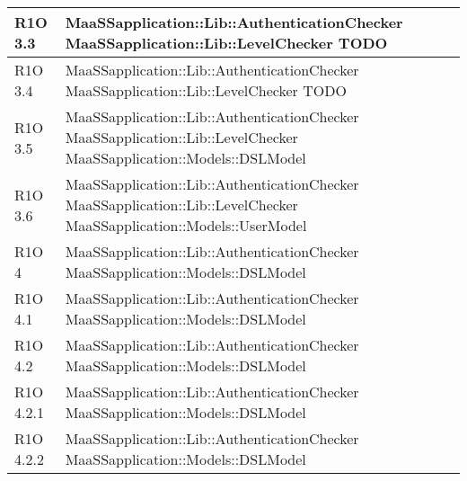 \begin{center}
\begin{longtable}{ | l | p{8cm} |}
	R1O 3.3 & MaaSSapplication::Lib::AuthenticationChecker \newline MaaSSapplication::Lib::LevelChecker TODO  \newline  \\ \hline
	
	R1O 3.4 & MaaSSapplication::Lib::AuthenticationChecker \newline MaaSSapplication::Lib::LevelChecker TODO  \newline  \\ \hline
	
	R1O 3.5 & MaaSSapplication::Lib::AuthenticationChecker \newline MaaSSapplication::Lib::LevelChecker \newline MaaSSapplication::Models::DSLModel  \newline  \\ \hline
	
	R1O 3.6 & MaaSSapplication::Lib::AuthenticationChecker \newline MaaSSapplication::Lib::LevelChecker \newline MaaSSapplication::Models::UserModel  \newline  \\ \hline
	
	R1O 4 & MaaSSapplication::Lib::AuthenticationChecker \newline MaaSSapplication::Models::DSLModel  \newline  \\ \hline
	
	R1O 4.1 & MaaSSapplication::Lib::AuthenticationChecker \newline MaaSSapplication::Models::DSLModel  \newline  \\ \hline
	
	R1O 4.2 & MaaSSapplication::Lib::AuthenticationChecker \newline MaaSSapplication::Models::DSLModel  \newline  \\ \hline
	
	R1O 4.2.1 & MaaSSapplication::Lib::AuthenticationChecker \newline  MaaSSapplication::Models::DSLModel  \newline  \\ \hline
	
	R1O 4.2.2 & MaaSSapplication::Lib::AuthenticationChecker \newline  MaaSSapplication::Models::DSLModel  \newline  \\ \hline
	

\end{longtable}
\end{center}
